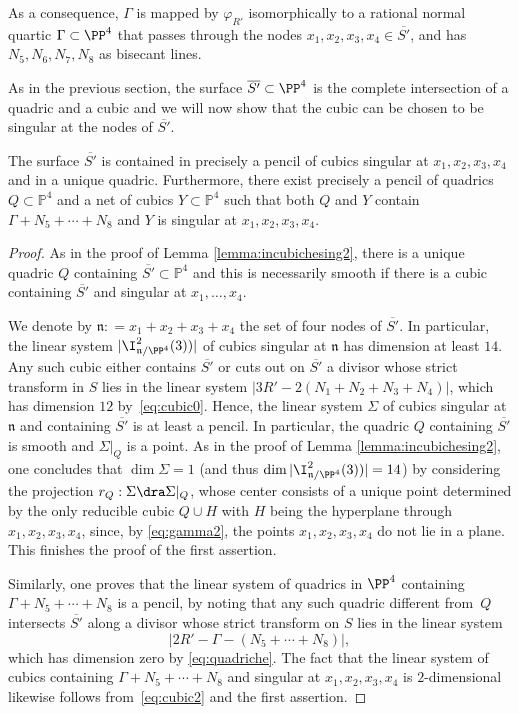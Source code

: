 As a consequence, $\Gamma$ is mapped by $\varphi_{R'}$ isomorphically to a rational normal quartic $\Gamma\subset \PP^4$ that passes through the nodes $x_1,x_2,x_3,x_4\in \overline{S'}$, and has $N_5,N_6,N_7,N_8$ as bisecant lines.

As in the previous section, the surface $\overline{S'}\subset \PP^4$ is the complete intersection of a quadric and a cubic and we will now show that the cubic can be chosen to be singular at the nodes of $\overline{S'}$.

\begin{lemma} \label{lemma:incubichesing}
The surface $\overline{S'}$ is contained in precisely a pencil of cubics singular at $x_1,x_2,x_3,x_4$ and in a unique quadric. Furthermore, there exist precisely a pencil of quadrics $Q \subset\mathbb P^4$ and a net of cubics $Y\subset\mathbb P^4$ such that both $Q$ and $Y$ contain $\Gamma+N_5+\cdots+N_8$ and $Y$ is singular at $x_1,x_2,x_3,x_4$.
\end{lemma}

\begin{proof}
As in the proof of Lemma \ref{lemma:incubichesing2}, there is a unique quadric $Q$ containing $\overline{S'}\subset \mathbb P^4$ and this is necessarily smooth if there is a cubic containing $\overline{S'}$ and singular at $x_1,\ldots,x_4$.\enlargethispage{.5\baselineskip}%

We denote by $\mathfrak{n}: = x_1 + x_2 + x_3 + x_4$ the set of four nodes of $\overline{S'}$. In particular, the linear system $|\I^2_{\mathfrak{n}/\PP^4}(3))|$ of cubics singular at $\mathfrak n$ has dimension at least $14$. Any such cubic either contains $\overline{S'}$ or cuts out on $\overline{S'}$ a divisor whose strict transform in $S$ lies in the linear system $|3R'-2(N_1+N_2+N_3+N_4)|$, which has dimension $12$ by~\eqref{eq:cubic0}. Hence, the linear system $\Sigma$ of cubics singular at $\mathfrak n$ and containing $\overline{S'}$ is at least a pencil. In particular, the quadric $Q$ containing $\overline{S'}$ is smooth and $\Sigma|_Q$ is a point. As in the proof of Lemma \ref{lemma:incubichesing2}, one concludes that $\dim \Sigma=1$ (and thus $\dim |\I^2_{\mathfrak{n}/\PP^4}(3))|=14$) by considering the projection $r_Q:\Sigma \dra \Sigma|_Q$, whose center consists of a unique point determined by the only reducible cubic $Q \cup H$ with $H$ being the hyperplane through $x_1,x_2,x_3,x_4$, since, by \eqref{eq:gamma2}, the points $x_1,x_2,x_3,x_4$ do not lie in a plane. This finishes the proof of the first assertion.

Similarly, one proves that the linear system of quadrics in $\PP^4$ containing $\Gamma+N_5+\cdots+N_8$ is a pencil, by noting that any such quadric different from~$Q$ intersects $\overline{S'}$ along a divisor whose strict transform on $S$ lies in the linear system\vspace*{-3pt}\enlargethispage{.5\baselineskip}
\[
|2R'-\Gamma-(N_5+\cdots+N_8)|,
\]
which has dimension zero by \eqref{eq:quadriche}. The fact that the linear system of cubics containing $\Gamma+N_5+\cdots+N_8$ and singular at $x_1,x_2,x_3,x_4$ is $2$-dimensional
likewise follows from~\eqref{eq:cubic2} and the first assertion.
\end{proof}

